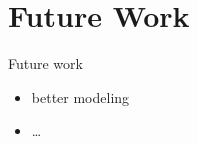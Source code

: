 \section{Future Work}\label{sec:fw}

Future work
\begin{itemize}
  \item better modeling
  \item \ldots
\end{itemize}
